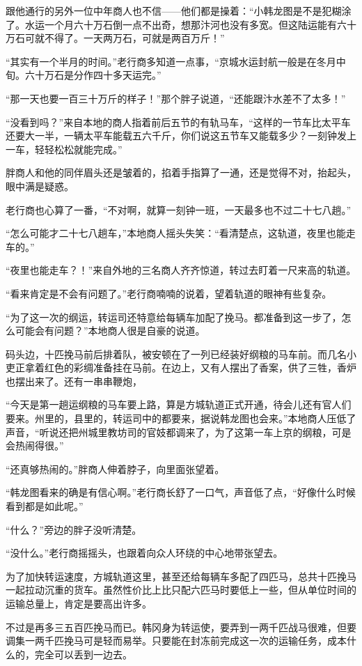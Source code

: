 跟他通行的另外一位中年商人也不信——他们都是操着：“小韩龙图是不是犯糊涂了。水运一个月六十万石倒一点不出奇，想那汴河也没有多宽。但这陆运能有六十万石可就不得了。一天两万石，可就是两百万斤！”

“其实有一个半月的时间。”老行商多知道一点事，“京城水运封航一般是在冬月中旬。六十万石是分作四十多天运完。”

“那一天也要一百三十万斤的样子！”那个胖子说道，“还能跟汴水差不了太多！”

“没看到吗？”来自本地的商人指着前后五节的有轨马车，“这样的一节车比太平车还要大一半，一辆太平车能载五六千斤，你们说这五节车又能载多少？一刻钟发上一车，轻轻松松就能完成。”

胖商人和他的同伴眉头还是皱着的，掐着手指算了一通，还是觉得不对，抬起头，眼中满是疑惑。

老行商也心算了一番，“不对啊，就算一刻钟一班，一天最多也不过二十七八趟。”

“怎么可能才二十七八趟车，”本地商人摇头失笑：“看清楚点，这轨道，夜里也能走车的。”

“夜里也能走车？！”来自外地的三名商人齐齐惊道，转过去盯着一尺来高的轨道。

“看来肯定是不会有问题了。”老行商喃喃的说着，望着轨道的眼神有些复杂。

“为了这一次的纲运，转运司还特意给每辆车加配了挽马。都准备到这一步了，怎么可能会有问题？”本地商人很是自豪的说道。

码头边，十匹挽马前后排着队，被安顿在了一列已经装好纲粮的马车前。而几名小吏正拿着红色的彩绸准备挂在马前。在边上，又有人摆出了香案，供了三牲，香炉也摆出来了。还有一串串鞭炮，

“今天是第一趟运纲粮的马车要上路，算是方城轨道正式开通，待会儿还有官人们要来。州里的，县里的，转运司中的都要来，据说韩龙图也会来。”本地商人压低了声音，“听说还把州城里教坊司的官妓都调来了，为了这第一车上京的纲粮，可是会热闹得很。”

“还真够热闹的。”胖商人伸着脖子，向里面张望着。

“韩龙图看来的确是有信心啊。”老行商长舒了一口气，声音低了点，“好像什么时候看到都是如此呢。”

“什么？”旁边的胖子没听清楚。

“没什么。”老行商摇摇头，也跟着向众人环绕的中心地带张望去。

为了加快转运速度，方城轨道这里，甚至还给每辆车多配了四匹马，总共十匹挽马一起拉动沉重的货车。虽然性价比上比只配六匹马时要低上一些，但从单位时间的运输总量上，肯定是要高出许多。

不过是再多三五百匹挽马而已。韩冈身为转运使，要弄到一两千匹战马很难，但要调集一两千匹挽马可是轻而易举。只要能在封冻前完成这一次的运输任务，成本什么的，完全可以丢到一边去。

